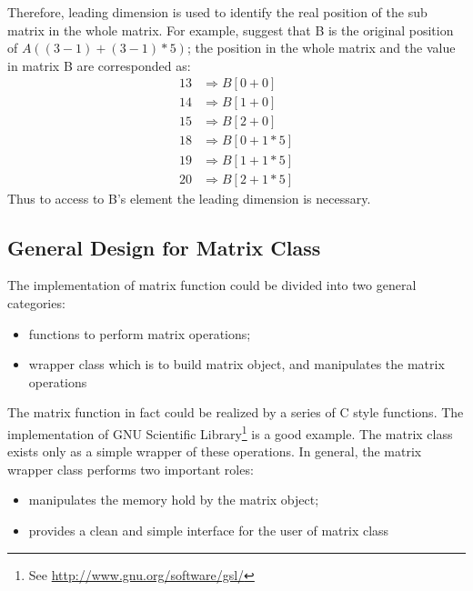 Therefore, leading dimension is used to identify the real 
position of the sub matrix in the whole matrix. For example,
suggest that B is the original position of $A((3-1)+(3-1)*5)$; 
the position in the whole matrix and the value in matrix B are 
corresponded as:
\begin{align}
13 &\Rightarrow  B[0+0]    \\ \nonumber  
14 &\Rightarrow  B[1+0]    \\ \nonumber 
15 &\Rightarrow  B[2+0]    \\ \nonumber 
18 &\Rightarrow  B[0+1*5]  \\ \nonumber 
19 &\Rightarrow  B[1+1*5]  \\ \nonumber 
20 &\Rightarrow  B[2+1*5]  
\end{align}
Thus to access to B's element the leading dimension is necessary.

\subsection{General Design for Matrix Class}
%
%
The implementation of matrix function could be divided into
two general categories:
\begin{itemize}
 \item functions to perform matrix operations;
 \item wrapper class which is to build matrix object, and manipulates
 the matrix operations
\end{itemize}

The matrix function in fact could be realized by a series of C style 
functions. The implementation of GNU Scientific Library\footnote{See 
\url{http://www.gnu.org/software/gsl/}} is a good example. The matrix
class exists only as a simple wrapper of these operations. In general,
the matrix wrapper class performs two important roles:
\begin{itemize}
 \item manipulates the memory hold by the matrix object;
 \item provides a clean and simple interface for the user of matrix class
\end{itemize}

